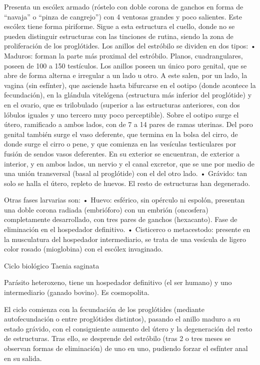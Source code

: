 Presenta un escólex armado (róstelo con doble corona de ganchos en forma de “navaja” o “pinza de cangrejo”) con 4 ventosas grandes y poco salientes. Este escólex tiene forma piriforme. Sigue a esta estructura el cuello, donde no se pueden distinguir estructuras con las tinciones de rutina, siendo la zona de proliferación de los proglótides. Los anillos del estróbilo se dividen en dos tipos:
• Maduros: forman la parte más proximal del estróbilo. Planos, cuadrangulares, poseen de 100 a 150 testículos. Los anillos poseen un único poro genital, que se abre de forma alterna e irregular a un lado u otro. A este salen, por un lado, la vagina (sin esfínter), que asciende hasta bifurcarse en el ootipo (donde acontece la fecundación), en la glándula vitelógena (estructura más inferior del proglótide) y en el ovario, que es trilobulado (superior a las estructuras anteriores, con dos lóbulos iguales y uno tercero muy poco perceptible). Sobre el ootipo surge el útero, ramificado a ambos lados, con de 7 a 14 pares de ramas uterinas. Del poro genital también surge el vaso deferente, que termina en la bolsa del cirro, de donde surge el cirro o pene, y que comienza en las vesículas testiculares por fusión de sendos vasos deferentes. En su exterior se encuentran, de exterior a interior, y en ambos lados, un nervio y el canal excretor, que se une por medio de una unión transversal (basal al proglótide) con el del otro lado.
• Grávido: tan solo se halla el útero, repleto de huevos. El resto de estructuras han degenerado.

Otras fases larvarias son:
• Huevo: esférico, sin opérculo ni espolón, presentan una doble corona radiada (embrióforo) con un embrión (oncosfera) completamente desarrollado, con tres pares de ganchos (hexacanto). Fase de eliminación en el hospedador definitivo.
• Cisticerco o metacestodo: presente en la musculatura del hospedador intermediario, se trata de una vesícula de ligero color rosado (mioglobina) con el escólex invaginado.


Ciclo biológico
Taenia saginata

Parásito heteroxeno, tiene un hospedador definitivo (el ser humano) y uno intermediario (ganado bovino). Es cosmopolita.

El ciclo comienza con la fecundación de los proglótides (mediante autofecundación o entre proglótides distintos), pasando el anillo maduro a su estado grávido, con el consiguiente aumento del útero y la degeneración del resto de estructuras. Tras ello, se desprende del estróbilo (tras 2 o tres meses se observan formas de eliminación) de uno en uno, pudiendo forzar el esfínter anal en su salida. 

